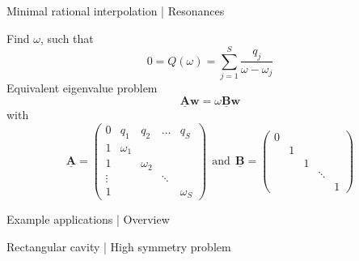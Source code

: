 \documentclass{beamer}
\begin{document}
\begin{frame}{Minimal rational interpolation | Resonances}

    Find $\omega$, such that
    \begin{equation*}
        0 = Q(\omega) = \sum_{j=1}^S \frac{q_j}{\omega - \omega_j}
    \end{equation*}
    Equivalent eigenvalue problem%
    \begin{equation*}
        \mathbf{\underline{A}} \mathbf{w} = \omega \mathbf{\underline{B}} \mathbf{w}
    \end{equation*}
    with
    \begin{equation*}
        \mathbf{\underline{A}} = \begin{pmatrix}
            0 & q_1 & q_2 & \dots & q_S \\
            1 & \omega_1 & & & \\
            1 & & \omega_2 & & \\
            \vdots & & & \ddots & \\
            1 & & & & \omega_S
        \end{pmatrix} ~~\text{and}~~
        \mathbf{\underline{B}} = \begin{pmatrix}
            0 & & & & \\
            & 1 & & & \\
            & & 1 & & \\ 
            & & & \ddots & \\ 
            & & & & 1
        \end{pmatrix}
    \end{equation*}

\end{frame}

\begin{frame}{Example applications | Overview}
    \begin{figure}
        \centering
        \scalebox{0.8}{}
    \end{figure}
\end{frame}

\begin{frame}{Rectangular cavity | High symmetry problem}
    \begin{figure}
        \centering
        \scalebox{0.8}{}
    \end{figure}
\end{frame}
\end{document}
